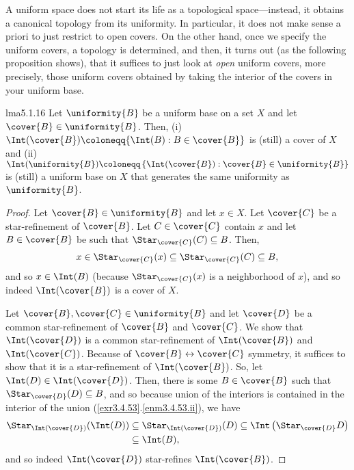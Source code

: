 A uniform space does not start its life as a topological space---instead, it obtains a canonical topology from its uniformity.  In particular, it does not make sense a priori to just restrict to open covers.  On the other hand, once we specify the uniform covers, a topology is determined, and then, it turns out (as the following proposition shows), that it suffices to just look at \emph{open} uniform covers, more precisely, those uniform covers obtained by taking the interior of the covers in your uniform base.
\begin{prp}{}{lma5.1.16}
Let $\uniformity{B}$ be a uniform base on a set $X$ and let $\cover{B}\in \uniformity{B}$.  Then, (i)~$\Int (\cover{B})\coloneqq \{ \Int (B):B\in \cover{B}\}$ is (still) a cover of $X$ and (ii)~$\Int (\uniformity{B})\coloneqq \left\{ \Int (\cover{B}):\cover{B}\in \uniformity{B}\right\}$ is (still) a uniform base on $X$ that generates the same uniformity as $\uniformity{B}$.
\begin{proof}
Let $\cover{B}\in \uniformity{B}$ and let $x\in X$.  Let $\cover{C}$ be a star-refinement of $\cover{B}$.  Let $C\in \cover{C}$ contain $x$ and let $B\in \cover{B}$ be such that $\Star _{\cover{C}}(C)\subseteq B$.  Then,
\begin{equation}
x\in \Star _{\cover{C}}(x)\subseteq \Star _{\cover{C}}(C)\subseteq B,
\end{equation}
and so $x\in \Int (B)$ (because $\Star _{\cover{C}}(x)$ is a neighborhood of $x$), and so indeed $\Int (\cover{B})$ is a cover of $X$.

Let $\cover{B},\cover{C}\in \uniformity{B}$ and let $\cover{D}$ be a common star-refinement of $\cover{B}$ and $\cover{C}$.  We show that $\Int (\cover{D})$ is a common star-refinement of $\Int (\cover{B})$ and $\Int (\cover{C})$.  Because of $\cover{B}\leftrightarrow \cover{C}$ symmetry, it suffices to show that it is a star-refinement of $\Int (\cover{B})$.  So, let $\Int (D)\in \Int (\cover{D})$.  Then, there is some $B\in \cover{B}$ such that $\Star _{\cover{D}}(D)\subseteq B$, and so because union of the interiors is contained in the interior of the union (\cref{exr3.4.53}.\cref{enm3.4.53.ii}), we have
\begin{equation}
\begin{split}
\Star _{\Int (\cover{D})}(\Int (D)) & \subseteq \Star _{\Int (\cover{D})}(D)\subseteq \Int \left( \Star _{\cover{D}}D\right) \\
& \subseteq \Int (B),
\end{split}
\end{equation}
and so indeed $\Int (\cover{D})$ star-refines $\Int (\cover{B})$.


\end{proof}
\end{prp}
